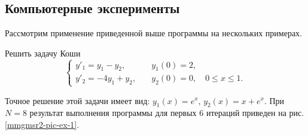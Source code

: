 


\subsection{Компьютерные эксперименты}
Рассмотрим применение приведенной выше программы на нескольких примерах.
\begin{example}\label{mmgmsr2-ex-1}
	Решить задачу Коши
	\begin{equation*}
	\begin{cases}
	y'_1= y_1 - y_2, &\quad y_1(0)=2,\\
	y'_2= -4y_1 + y_2, &\quad y_2(0) = 0, \quad 0 \le x \le 1.
	\end{cases}
	\end{equation*}
\end{example}
Точное решение этой задачи имеет вид: $y_1(x)=e^x$, $y_2(x)=x+e^x$.
При $N=8$ результат выполнения программы для первых 6 итераций приведен на рис. \ref{mmgmsr2-pic-ex-1}.

